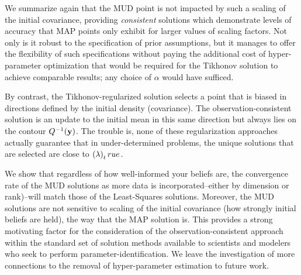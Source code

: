 We summarize again that the MUD point is not impacted by such a scaling of the initial covariance, providing \emph{consistent} solutions which demonstrate levels of accuracy that MAP points only exhibit for larger values of scaling factors.
Not only is it robust to the specification of prior assumptions, but it manages to offer the flexibility of such specifications without paying the additional cost of hyper-parameter optimization that would be required for the Tikhonov solution to achieve comparable results; any choice of $\alpha$ would have sufficed.

By contrast, the Tikhonov-regularized solution selects a point that is biased in directions defined by the initial density (covariance).
The observation-consistent solution is an update to the initial mean in this same direction but always lies on the contour $Q^{-1}(\mathbf{y})$.
The trouble is, none of these regularization approaches actually guarantee that in under-determined problems, the unique solutions that are selected are close to $\left ( \lambda \right )_true$.

We show that regardless of how well-informed your beliefs are, the convergence rate of the MUD solutions as more data is incorporated\---either by dimension or rank)\---will match those of the Least-Squares solutions.
Moreover, the MUD solutions are not sensitive to scaling of the initial covariance (how strongly initial beliefs are held), the way that the MAP solution is.
This provides a strong motivating factor for the consideration of the observation-consistent approach within the standard set of solution methods available to scientists and modelers who seek to perform parameter-identification.
We leave the investigation of more connections to the removal of hyper-parameter estimation to future work.
